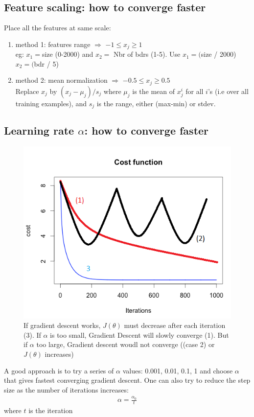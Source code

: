 \documentclass[a4paper,12pt]{report}
\begin{document}
\subsection{Feature scaling: how to converge faster}
Place all the features at same scale:
\begin{enumerate}
\item method 1: features range $\Rightarrow$ $-1 \leq x_j \geq 1$ \\
eg: $x_1 = $size (0-2000) and $x_2=$ Nbr of bdrs (1-5).
Use $x_1=($size / 2000)  $x_2=($bdr / 5)
\item method 2: mean normalization $\Rightarrow$ $-0.5 \leq x_j \geq 0.5$ \\
Replace  $x_j$ by $(x_j - \mu_j)/s_j$ where $\mu_j$ is the mean of $x_j ^i$ for all $i$'s (i.e over all training examples), and $s_j$ is the range, either (max-min) or stdev. 
\end{enumerate}

\subsection{Learning rate $\alpha$: how to converge faster}
\begin{figure}[H]
\centering
        \includegraphics[totalheight=6 cm]{learningRate.png}
						\caption{
								\label{learningRate} If gradient descent works, $J(\theta)$ must decrease after each iteration (3). If $\alpha$ is too small, Gradient Descent will slowly converge (1). But if $\alpha$ too large, Gradient descent woudl not converge ((case 2) or $J(\theta)$ increases) }
\end{figure}
A good approach is to try a series of $\alpha$ values: 0.001, 0.01, 0.1, 1 and choose $\alpha$ that gives fastest converging gradient descent.
One can also try to reduce the step size as the number of iterations increases:
\begin{align}
\alpha = \frac{\alpha_0}{t}
\end{align}
where $t$ is the iteration
\end{document}
